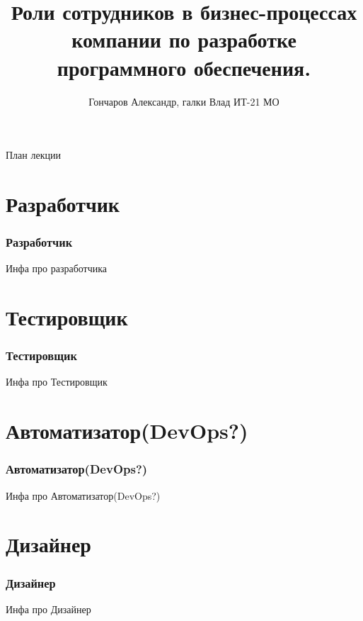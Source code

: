 \documentclass{../industrial-development}
\title{Роли сотрудников в бизнес-процессах компании по разработке программного обеспечения.}
\author{Гончаров Александр, галки Влад ИТ-21 МО}
\date{}
\begin{document}
\begin{frame}
  \titlepage
\end{frame}

\begin{frame}{План лекции}
  \tableofcontents
\end{frame}


\section{Разработчик }

\begin{frame} \frametitle{Разработчик}
	\begin{block}{}
		\alert {}Инфа про разработчика
	\end{block}
	
\end{frame}

\section{Тестировщик }

\begin{frame} \frametitle{Тестировщик}
	\begin{block}{}
		\alert {}Инфа про Тестировщик
	\end{block}
	
\end{frame}

\section{Автоматизатор(DevOps?) }

\begin{frame} \frametitle{Автоматизатор(DevOps?)}
	\begin{block}{}
		\alert {}Инфа про Автоматизатор(DevOps?)
	\end{block}
	
\end{frame}

\section{Дизайнер }

\begin{frame} \frametitle{Дизайнер}
	\begin{block}{}
		\alert {}Инфа про Дизайнер
	\end{block}
	
\end{frame}
\end{document}
